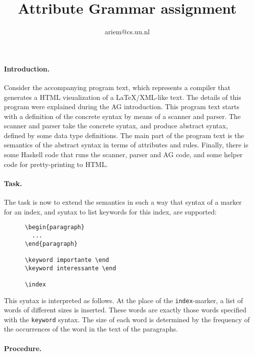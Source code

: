 \documentclass[a4paper]{article}
\title{Attribute Grammar assignment}
\author{ariem@cs.uu.nl}
\begin{document}
\maketitle

\vspace{-3em}\paragraph{Introduction.}

Consider the accompanying program text, which represents a compiler that generates a HTML visualization of a LaTeX/XML-like text. The details of this program were explained during the AG introduction. This program text starts with a definition of the concrete syntax by means of a scanner and parser. The scanner and parser take the concrete syntax, and produce abstract syntax, defined by some data type definitions. The main part of the program text is the semantics of the abstract syntax in terms of attributes and rules. Finally, there is some Haskell code that runs the scanner, parser and AG code, and some helper code for pretty-printing to HTML.

\paragraph{Task.}

The task is now to extend the semantics in such a way that syntax of a marker for an index, and syntax to list keywords for this index, are supported:

{\small
\begin{verbatim}
      \begin{paragraph}
        ...
      \end{paragraph}

      \keyword importante \end
      \keyword interessante \end

      \index
\end{verbatim}}

This syntax is interpreted as follows. At the place of the {\tt index}-marker, a list of words of different sizes is inserted. These words are exactly those words specified with the {\tt keyword} syntax. The size of each word is determined by the frequency of the occurrences of the word in the text of the paragraphs.

\paragraph{Procedure.}
\end{document}
